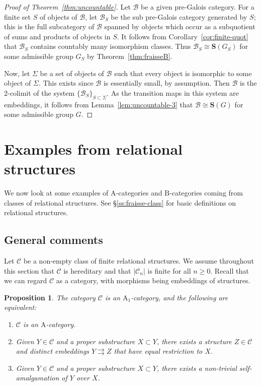 \documentclass[12pt]{amsart}
\numberwithin{equation}{section}
\newtheorem{proposition}[equation]{Proposition}
\theoremstyle{definition}
\newcommand{\rA}{\mathrm{A}}
\newcommand{\cB}{\mathcal{B}}
\newcommand{\rB}{\mathrm{B}}
\newcommand{\cC}{\mathcal{C}}
\newcommand{\bS}{\mathbf{S}}
\begin{document}
\begin{proof}[Proof of Theorem~\ref{thm:uncountable}]
Let $\cB$ be a given pre-Galois category. For a finite set $S$ of objects of $\cB$, let $\cB_S$ be the sub pre-Galois category generated by $S$; this is the full subcategory of $\cB$ spanned by objects which occur as a subquotient of sums and products of objects in $S$. It follows from Corollary~\ref{cor:finite-quot} that $\cB_S$ contains countably many isomorphism classes. Thus $\cB_S \cong \bS(G_S)$ for some admissible group $G_S$ by Theorem~\ref{thm:fraisseB}.

Now, let $\Sigma$ be a set of objects of $\cB$ such that every object is isomorphic to some object of $\Sigma$. This exists since $\cB$ is essentially small, by assumption. Then $\cB$ is the 2-colimit of the system $\{\cB_S\}_{S \subset \Sigma}$. As the transition maps in this system are embeddings, it follows from Lemma~\ref{lem:uncountable-3} that $\cB \cong \bS(G)$ for some admissible group $G$.
\end{proof}

\section{Examples from relational structures} \label{s:examples}

We now look at some examples of $\rA$-categories and $\rB$-categories coming from classes of relational structures. See \S \ref{ss:fraisse-class} for basic definitions on relational structures.

\subsection{General comments}

Let $\cC$ be a non-empty class of finite relational structures. We assume throughout this section that $\cC$ is hereditary and that $\vert \cC_n \vert$ is finite for all $n \ge 0$. Recall that we can regard $\cC$ as a category, with morphisms being embeddings of structures.

\begin{proposition} \label{prop:A-struct}
The category $\cC$ is an $\rA_1$-category, and the following are equivalent:
\begin{enumerate}
\item $\cC$ is an $\rA$-category.
\item Given $Y \in \cC$ and a proper substructure $X \subset Y$, there exists a structure $Z \in \cC$ and distinct embeddings $Y \rightrightarrows Z$ that have equal restriction to $X$.
\item Given $Y \in \cC$ and a proper substructure $X \subset Y$, there exists a non-trivial self-amalgamation of $Y$ over $X$.
\end{enumerate}
\end{proposition}
\end{document}
